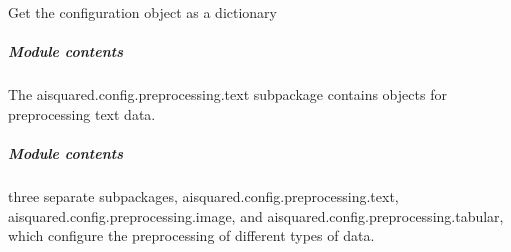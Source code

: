 \documentclass[letterpaper,10pt,english]{sphinxmanual}
\begin{document}
\begin{fulllineitems}
\begin{fulllineitems}
\label{\detokenize{aisquared.config.preprocessing.text:aisquared.config.preprocessing.text.TextPreprocessing.TextPreprocesser.step_dict}}
\pysigstartsignatures
{}
\pysigstopsignatures
\end{fulllineitems}


\begin{fulllineitems}
\label{\detokenize{aisquared.config.preprocessing.text:aisquared.config.preprocessing.text.TextPreprocessing.TextPreprocesser.to_dict}}
\pysigstartsignatures
{}
\pysigstopsignatures
\sphinxAtStartPar
Get the configuration object as a dictionary

\end{fulllineitems}


\end{fulllineitems}



\subparagraph{Module contents}
\label{\detokenize{aisquared.config.preprocessing.text:module-aisquared.config.preprocessing.text}}\label{\detokenize{aisquared.config.preprocessing.text:module-contents}}
\sphinxAtStartPar
The aisquared.config.preprocessing.text subpackage contains objects for preprocessing text data.


\subparagraph{Module contents}
\label{\detokenize{aisquared.config.preprocessing:module-aisquared.config.preprocessing}}\label{\detokenize{aisquared.config.preprocessing:module-contents}}\begin{description}
\sphinxAtStartPar
three separate subpackages, aisquared.config.preprocessing.text, aisquared.config.preprocessing.image, and aisquared.config.preprocessing.tabular, which configure the preprocessing of different types of data.

\end{description}
\end{document}
